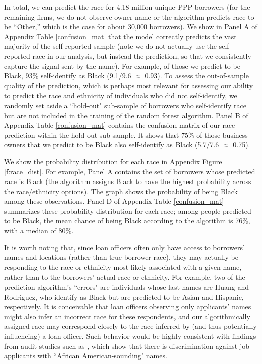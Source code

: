 \documentclass[11pt]{article}
\begin{document}
In total, we can predict the race for 4.18 million unique PPP borrowers (for the remaining firms, we do not observe owner name or the algorithm predicts race to be ``Other,'' which is the case for about 30,000 borrowers). We show in Panel A of Appendix Table \ref{confusion_mat} that the model correctly predicts the vast majority of the self-reported sample (note we do not actually use the self-reported race in our analysis, but instead the prediction, so that we consistently capture the signal sent by the name). For example, of those we predict to be Black, 93\% self-identify as Black (9.1/9.6 $\approx$ 0.93). To assess the out-of-sample quality of the prediction, which is perhaps most relevant for assessing our ability to predict the race and ethnicity of individuals who did not self-identify, we randomly set aside a ``hold-out" sub-sample of borrowers who self-identify race but are not included in the training of the random forest algorithm. Panel B of Appendix Table \ref{confusion_mat} contains the confusion matrix of our race prediction within the hold-out sub-sample. It shows that 75\% of those business owners that we predict to be Black also self-identify as Black (5.7/7.6 $\approx$ 0.75). 

We show the probability distribution for each race in Appendix Figure \ref{f:race_dist}. For example, Panel A contains the set of borrowers whose predicted race is Black (the algorithm assigns Black to have the highest probability across the race/ethnicity options). The graph shows the probability of being Black among these observations. Panel D of Appendix Table \ref{confusion_mat} summarizes these probability distribution for each race; among people predicted to be Black, the mean chance of being Black according to the algorithm is 76\%, with a median of 80\%. 

It is worth noting that, since loan officers often only have access to borrowers' names and locations (rather than true borrower race), they may actually be responding to the race or ethnicity most likely associated with a given name, rather than to the borrowers' actual race or ethnicity. For example, two of the prediction algorithm's ``errors" are individuals whose last names are Huang and Rodriguez, who identify as Black but are predicted to be Asian and Hispanic, respectively. It is conceivable that loan officers observing only applicants' names might also infer an incorrect race for these respondents, and our algorithmically assigned race may correspond closely to the race inferred by (and thus potentially influencing) a loan officer. Such behavior would be highly consistent with findings from audit studies such as \citep{bertrand2004emily}, which show that there is discrimination against job applicants with ``African American-sounding" names. 
 
\end{document}
